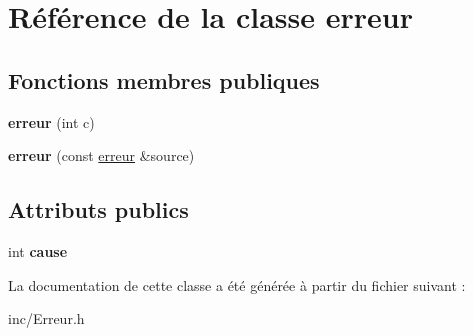 \hypertarget{classerreur}{
\section{Référence de la classe erreur}
\label{classerreur}
}
\subsection*{Fonctions membres publiques}
\begin{DoxyCompactItemize}
\item 
\hypertarget{classerreur_a95060559d107fe1a250fb1fb0f9f0cfa}{
{\bfseries erreur} (int c)}
\label{classerreur_a95060559d107fe1a250fb1fb0f9f0cfa}

\item 
\hypertarget{classerreur_af51ada62a9c20d282865f4fb8d3fdeda}{
{\bfseries erreur} (const \hyperlink{classerreur}{erreur} \&source)}
\label{classerreur_af51ada62a9c20d282865f4fb8d3fdeda}

\end{DoxyCompactItemize}
\subsection*{Attributs publics}
\begin{DoxyCompactItemize}
\item 
\hypertarget{classerreur_a32cfb866208f19b7291269e3b53180ad}{
int {\bfseries cause}}
\label{classerreur_a32cfb866208f19b7291269e3b53180ad}

\end{DoxyCompactItemize}


La documentation de cette classe a été générée à partir du fichier suivant :\begin{DoxyCompactItemize}
\item 
inc/Erreur.h\end{DoxyCompactItemize}
